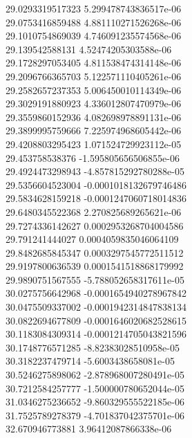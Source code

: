 {29.0293319517323 5.299478743836517e-06 \\
29.0753416859488 4.881110271526268e-06 \\
29.1010754869039 4.746091235574568e-06 \\
29.139542588131 4.52474205303588e-06 \\
29.1728297053405 4.811538474314148e-06 \\
29.2096766365703 5.122571110405261e-06 \\
29.2582657237353 5.006450010114349e-06 \\
29.3029191880923 4.336012807470979e-06 \\
29.3559860152936 4.082698978891131e-06 \\
29.3899995759666 7.225974968605442e-06 \\
29.4208803295423 1.071524729923112e-05 \\
29.453758538376 -1.595805656506855e-06 \\
29.4924473298943 -4.857815292780288e-05 \\
29.5356604523004 -0.0001018132679746486 \\
29.5834628159218 -0.0001247060718014836 \\
29.6480345522368 2.270825689265621e-06 \\
29.7274336142627 0.0002953268704004586 \\
29.791241444027 0.0004059835046064109 \\
29.8482685845347 0.0003297545772511512 \\
29.9197800636539 0.0001541518868179992 \\
29.9890751567555 -5.788052658317611e-05 \\
30.0275756642968 -0.0001654940278967842 \\
30.0475509337002 -0.0001942314847838134 \\
30.0822694677809 -0.0001646020682528615 \\
30.1183084309314 -0.0001214705043821596 \\
30.1748776571285 -8.82383028510958e-05 \\
30.3182237479714 -5.6003438658081e-05 \\
30.5246275898062 -2.878968007280491e-05 \\
30.7212584257777 -1.500000780652044e-05 \\
31.0346275236652 -9.860329555522185e-06 \\
31.7525789278379 -4.701837042375701e-06 \\
32.670946773881 3.96412087866338e-06 \\
}
